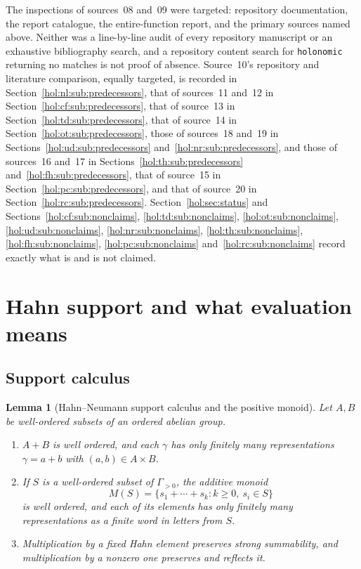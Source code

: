 \documentclass[11pt]{article}
\numberwithin{equation}{section}
\newtheorem{lemma}[theorem]{Lemma}
\theoremstyle{definition}
\theoremstyle{remark}
\begin{document}
The inspections of sources~08 and~09 were targeted: repository documentation,
the report catalogue, the entire-function report, and the primary sources
named above. Neither was a line-by-line audit of every repository manuscript
or an exhaustive bibliography search, and a repository content search for
\texttt{holonomic} returning no matches is not proof of absence. Source~10's
repository and literature comparison, equally targeted, is recorded in
Section~\ref{hol:nl:sub:predecessors}, that of sources~11 and~12 in
Section~\ref{hol:cf:sub:predecessors}, that of source~13 in
Section~\ref{hol:td:sub:predecessors}, that of source~14 in
Section~\ref{hol:ot:sub:predecessors}, those of sources~18 and~19 in
Sections~\ref{hol:ud:sub:predecessors} and~\ref{hol:nr:sub:predecessors}, and
those of sources~16 and~17 in Sections~\ref{hol:th:sub:predecessors}
and~\ref{hol:fh:sub:predecessors}, that of source~15 in
Section~\ref{hol:pc:sub:predecessors}, and that of source~20 in
Section~\ref{hol:rc:sub:predecessors}. Section~\ref{hol:sec:status} and
Sections~\ref{hol:cf:sub:nonclaims}, \ref{hol:td:sub:nonclaims},
\ref{hol:ot:sub:nonclaims}, \ref{hol:ud:sub:nonclaims},
\ref{hol:nr:sub:nonclaims}, \ref{hol:th:sub:nonclaims},
\ref{hol:fh:sub:nonclaims}, \ref{hol:pc:sub:nonclaims}
and~\ref{hol:rc:sub:nonclaims} record exactly what is and is not claimed.

\section{Hahn support and what evaluation means}\label{hol:sec:support}

\subsection{Support calculus}

\begin{lemma}[Hahn--Neumann support calculus and the positive monoid]
\label{hol:lem:support}
Let $A,B$ be well-ordered subsets of an ordered abelian group.
\begin{enumerate}[label=\textup{(\arabic*)}]
\item $A+B$ is well ordered, and each $\gamma$ has only finitely many
representations $\gamma=a+b$ with $(a,b)\in A\times B$.
\item If $S$ is a well-ordered subset of $\Gamma_{>0}$, the additive monoid
\[
 M(S)=\{s_1+\cdots+s_k:k\ge0,\ s_i\in S\}
\]
is well ordered, and each of its elements has only finitely many
representations as a finite word in letters from $S$.
\item Multiplication by a fixed Hahn element preserves strong summability, and
multiplication by a nonzero one preserves and reflects it.
\end{enumerate}
\end{lemma}
\end{document}
